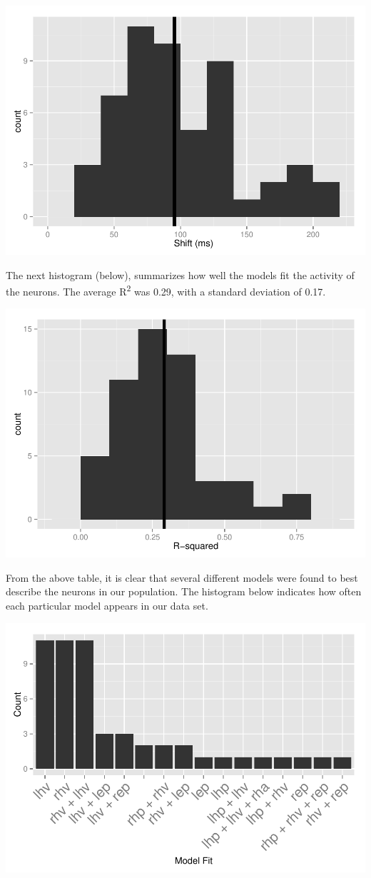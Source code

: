 \documentclass[]{article}
\begin{document}
\includegraphics{NRGRecord_files/figure-latex/shift_histogram-1.pdf}

The next histogram (below), summarizes how well the models fit the
activity of the neurons. The average R\textsuperscript{2} was 0.29, with
a standard deviation of 0.17.

\includegraphics{NRGRecord_files/figure-latex/rsquared_histogram-1.pdf}

From the above table, it is clear that several different models were
found to best describe the neurons in our population. The histogram
below indicates how often each particular model appears in our data set.

\includegraphics{NRGRecord_files/figure-latex/modelcount-1.pdf}
\end{document}

